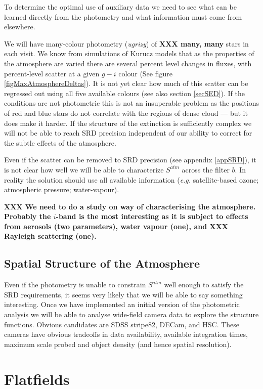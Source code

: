 \documentclass[12pt]{article}
\newcommand{\eg}{\textit{e.g.}\xspace}
\newcommand{\XXX}[1]{\textbf{XXX #1}\xspace}
\begin{document}
To determine the optimal use of auxiliary data we need to see what can be learned directly from the
photometry and what information must come from elsewhere.

We will have many-colour photometry (\textit{ugrizy}) of \XXX{many, many} stars in each visit.  We know from
simulations of Kurucz models that as the properties of the atmosphere are varied there are several percent
level changes in fluxes, with percent-level scatter at a given $g - i$ colour (See figure
\ref{figMaxAtmosphereDeltas}).  It is not yet clear how much of this scatter can be regressed out using all
five available colours (see also section \ref{secSED}). If the
conditions are not photometric this is not an insuperable problem as the positions of red and blue
stars do not correlate with the regions of dense cloud --- but it does make it harder.  If the structure
of the extinction is sufficiently complex we will not be able to reach SRD precision independent of
our ability to correct for the subtle effects of the atmosphere.

Even if the scatter can be removed to SRD precision (see appendix \ref{appSRD}), it is not clear how well
we will be able to characterize $S^{atm}$ across the filter $b$.  In reality the solution should use all
available information (\eg satellite-based ozone; atmospheric pressure; water-vapour).

\XXX{We need to do a study on way of characterising the atmosphere. Probably the $i$-band is the most
interesting as it is subject to effects from aerosols (two parameters), water vapour (one), and \XXX{Rayleigh scattering} (one).}

\subsection{Spatial Structure of the Atmosphere}

Even if the photometry is unable to constrain $S^{atm}$ well enough to satisfy the SRD requirements, it seems
very likely that we will be able to say something interesting.  Once we have implemented an initial version of
the photometric analysis we will be able to analyse wide-field camera data to explore the structure functions.
Obvious candidates are SDSS stripe82, DECam, and HSC.  These cameras have obvious tradeoffs in data
availability, available integration times, maximum scale probed and object density (and hence spatial
resolution).

\section{Flatfields}
\label{secFlatFielding}
\end{document}
